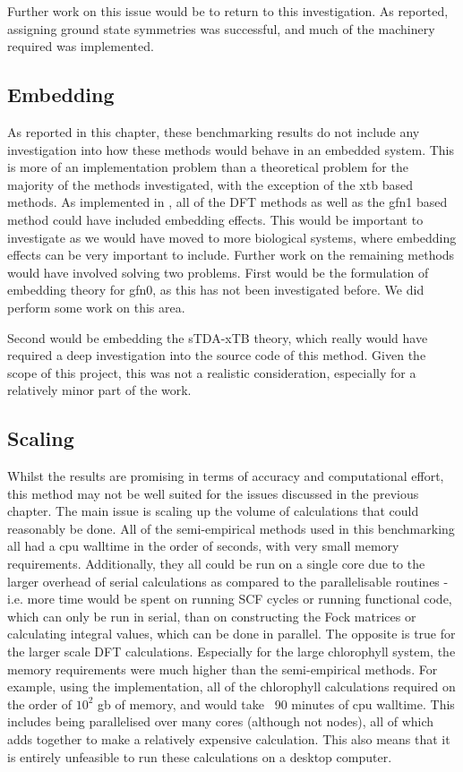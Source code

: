 Further work on this issue would be to return to this investigation. As reported, 
assigning ground state symmetries was successful, and much of the machinery required
was implemented.

\subsection{Embedding}
\label{subsec:dscf_embedding}

As reported in this chapter, these benchmarking results do not include any investigation
into how these methods would behave in an embedded system. This is more of an 
implementation problem than a theoretical problem for the majority of the methods
investigated, with the exception of the xtb based methods.
As implemented in , all of the DFT methods as well as the gfn1 based
method could have included embedding effects. This would be important to investigate
as we would have moved to more biological systems, where embedding effects can be
very important to include.
Further work on the remaining methods would have involved solving two problems. First would
be the formulation of embedding theory for gfn0, as this has not been investigated
before. We did perform some work on this area.

Second would be embedding the sTDA-xTB theory, which really would have required 
a deep investigation into the source code of this method. Given the scope of this
project, this was not a realistic consideration, especially for a relatively minor
part of the work.

\subsection{Scaling}
\label{subsec:dscf_scaling}

Whilst the \dscf results are promising in terms of accuracy and computational 
effort, this method may not be well suited for the issues discussed in the previous
chapter. The main issue is scaling up the volume of calculations that could reasonably
be done.
All of the semi-empirical methods used in this benchmarking all had a cpu walltime 
in the order of seconds, with very small memory requirements. Additionally, they
all could be run on a single core due to the larger overhead of serial calculations
as compared to the parallelisable routines - i.e. more time would be spent on running
SCF cycles or running functional code, which can only be run in serial, than on
constructing the Fock matrices or calculating integral values, which can be done in
parallel.
The opposite is true for the larger scale DFT calculations. Especially for the large
chlorophyll system, the memory requirements were much higher than the semi-empirical
methods. For example, using the  implementation, all of the chlorophyll 
calculations required on the order of $10^2$ gb of memory, and would take ~90 minutes
of cpu walltime. This includes being parallelised over many cores (although not
nodes), all of which adds together to make a relatively expensive calculation. This
also means that it is entirely unfeasible to run these calculations on a desktop
computer.

